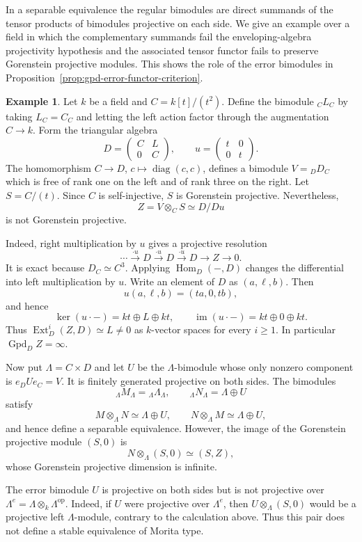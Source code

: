 \documentclass[12pt,a4paper,english,reqno]{amsart}
\numberwithin{equation}{section}
\theoremstyle{plain}
\theoremstyle{definition}
\newtheorem{example}[theorem]{Example}
\begin{document}
In a separable equivalence the regular bimodules are direct
summands of the tensor products of bimodules projective on each
side. We give an example over a field in which the complementary
summands fail the enveloping-algebra projectivity hypothesis
and the associated tensor functor fails to preserve Gorenstein
projective modules. This shows the role of the error bimodules
in Proposition~\ref{prop:gpd-error-functor-criterion}.

\begin{example}
\label{ex:separable-pair-not-gp-preserving}
Let $k$ be a field and $C=k[t]/(t^2)$.  Define the bimodule
${}_CL_C$ by taking $L_C=C_C$ and letting the left action factor
through the augmentation $C\to k$.  Form the triangular algebra
\[
 D=\begin{pmatrix}C&L\\0&C\end{pmatrix},
 \qquad
 u=\begin{pmatrix}t&0\\0&t\end{pmatrix}.
\]
The homomorphism $C\to D$, $c\mapsto\operatorname{diag}(c,c)$,
defines a bimodule $V={}_DD_C$ which is free of rank one on the
left and of rank three on the right.  Let $S=C/(t)$.  Since
$C$ is self-injective, $S$ is Gorenstein projective.  Nevertheless,
\[
 Z=V\otimes_CS\simeq D/Du
\]
is not Gorenstein projective.

Indeed, right multiplication by $u$ gives a projective resolution
\[
 \cdots\xrightarrow{\cdot u}D\xrightarrow{\cdot u}D
 \xrightarrow{\cdot u}D\longrightarrow Z\longrightarrow0.
\]
It is exact because $D_C\simeq C^3$.  Applying
$\operatorname{Hom}_D(-,D)$ changes the differential into left
multiplication by $u$.  Write an element of $D$ as $(a,\ell,b)$.
Then
\[
 u(a,\ell,b)=(ta,0,tb),
\]
and hence
\[
 \ker(u\cdot-)=kt\oplus L\oplus kt,
 \qquad
 \operatorname{im}(u\cdot-)=kt\oplus0\oplus kt.
\]
Thus $\operatorname{Ext}_D^i(Z,D)\simeq L\neq0$ as $k$-vector
spaces for every $i\geq1$.  In particular
$\operatorname{Gpd}_D Z=\infty$.

Now put $\Lambda=C\times D$ and let $U$ be the $\Lambda$-bimodule
whose only nonzero component is
$e_DUe_C=V$.  It is finitely generated projective on both sides.
The bimodules
\[
 {}_\Lambda M_\Lambda={}_\Lambda\Lambda_\Lambda,
 \qquad
 {}_\Lambda N_\Lambda=\Lambda\oplus U
\]
satisfy
\[
 M\otimes_\Lambda N\simeq\Lambda\oplus U,
 \qquad
 N\otimes_\Lambda M\simeq\Lambda\oplus U,
\]
and hence define a separable equivalence.  However, the image of
the Gorenstein projective module $(S,0)$ is
\[
 N\otimes_\Lambda(S,0)\simeq(S,Z),
\]
whose Gorenstein projective dimension is infinite.

The error bimodule $U$ is projective on both sides but is not
projective over $\Lambda^e=\Lambda\otimes_k\Lambda^{\mathrm{op}}$.
Indeed, if $U$ were projective over $\Lambda^e$, then
$U\otimes_\Lambda(S,0)$ would be a projective left $\Lambda$-module,
contrary to the calculation above.  Thus this pair does not define
a stable equivalence of Morita type.
\end{example}
\end{document}
